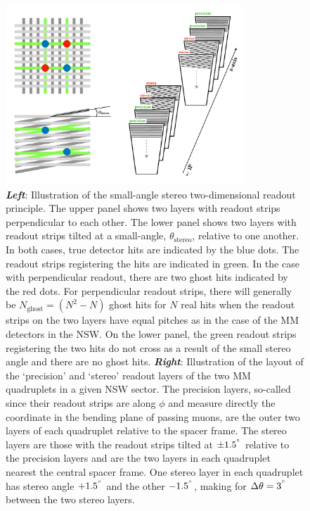 \begin{figure}[!htb]
    \begin{center}
        \includegraphics[width=0.8\textwidth]{figures/nsw/mm_stereo_cartoonPDF}
        \caption{
            \textbf{\textit{Left}}: Illustration of the small-angle stereo two-dimensional readout principle.
                The upper panel shows two layers with readout strips perpendicular to each other.
                The lower panel shows two layers with readout strips tilted at a small-angle,
                $\theta_{\text{stereo}}$, relative to one another.
                In both cases, true detector hits are indicated by the blue dots.
                The readout strips registering the hits are indicated in green.
                In the case with perpendicular readout, there are two ghost hits indicated
                by the red dots.
                For perpendicular readout strips, there will generally be $N_{\text{ghost}} = (N^2 - N)$
                ghost hits for $N$ real hits when the readout strips on the two layers have
                equal pitches as in the case of the MM detectors in the NSW.
                On the lower panel, the green readout strips registering the two hits
                do not cross as a result of the small stereo angle and there are no ghost hits.
            \textbf{\textit{Right}}: Illustration of the layout of the `precision' and `stereo'
                readout layers of the two MM quadruplets in a given NSW sector.
                The precision layers, so-called since their readout strips are along $\phi$ and measure directly the
                coordinate in the bending plane of passing muons, are the outer two layers of
                each quadruplet relative to the spacer frame.
                The stereo layers are those with the readout strips tilted at $\pm 1.5^{\degree}$ relative to the precision layers and are the two layers
                in each quadruplet nearest the central spacer frame.
                One stereo layer in each quadruplet has stereo angle $+1.5^{\degree}$ and the other $-1.5^{\degree}$, making
                for $\Delta \theta = 3^{\degree}$ between the two stereo layers.
        }
        \label{fig:mm_stereo}
    \end{center}
\end{figure}

